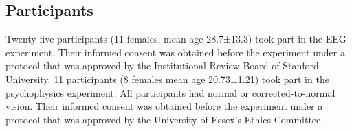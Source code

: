 \documentclass[9pt,twocolumn,twoside,lineno]{pnas-new}
\begin{document}




\subsection*{Participants}
Twenty-five participants (11 females, mean age 28.7±13.3) took part in the EEG experiment. Their informed consent was obtained before the experiment under a protocol that was approved by the Institutional Review Board of Stanford University. 11 participants (8 females mean age 20.73±1.21) took part in the psychophysics experiment. All participants had normal or corrected-to-normal vision. Their informed consent was obtained before the experiment under a protocol that was approved by the University of Essex's Ethics Committee.
\end{document}
